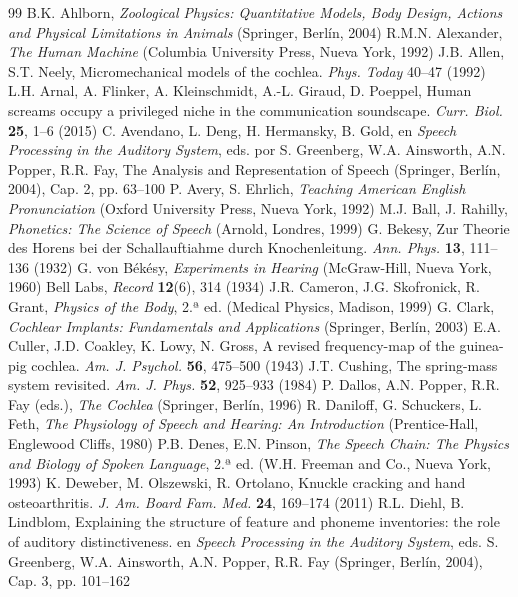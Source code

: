 \documentclass[12pt]{book}
\begin{document}
\begin{thebibliography}{99}
 B.K. Ahlborn, \textit{Zoological Physics: Quantitative Models, Body Design, Actions and Physical Limitations in Animals} (Springer, Berlín, 2004)
 R.M.N. Alexander, \textit{The Human Machine} (Columbia University Press, Nueva York, 1992)
 J.B. Allen, S.T. Neely, Micromechanical models of the cochlea. \textit{Phys. Today} 40--47 (1992)
 L.H. Arnal, A. Flinker, A. Kleinschmidt, A.-L. Giraud, D. Poeppel, Human screams occupy a privileged niche in the communication soundscape. \textit{Curr. Biol.} \textbf{25}, 1--6 (2015)
 C. Avendano, L. Deng, H. Hermansky, B. Gold, en \textit{Speech Processing in the Auditory System}, eds. por S. Greenberg, W.A. Ainsworth, A.N. Popper, R.R. Fay, The Analysis and Representation of Speech (Springer, Berlín, 2004), Cap. 2, pp. 63--100
 P. Avery, S. Ehrlich, \textit{Teaching American English Pronunciation} (Oxford University Press, Nueva York, 1992)
 M.J. Ball, J. Rahilly, \textit{Phonetics: The Science of Speech} (Arnold, Londres, 1999)
 G. Bekesy, Zur Theorie des Horens bei der Schallauftiahme durch Knochenleitung. \textit{Ann. Phys.} \textbf{13}, 111--136 (1932)
 G. von Békésy, \textit{Experiments in Hearing} (McGraw-Hill, Nueva York, 1960)
 Bell Labs, \textit{Record} \textbf{12}(6), 314 (1934)
 J.R. Cameron, J.G. Skofronick, R. Grant, \textit{Physics of the Body}, 2.ª ed. (Medical Physics, Madison, 1999)
 G. Clark, \textit{Cochlear Implants: Fundamentals and Applications} (Springer, Berlín, 2003)
 E.A. Culler, J.D. Coakley, K. Lowy, N. Gross, A revised frequency-map of the guinea-pig cochlea. \textit{Am. J. Psychol.} \textbf{56}, 475--500 (1943)
 J.T. Cushing, The spring-mass system revisited. \textit{Am. J. Phys.} \textbf{52}, 925--933 (1984)
 P. Dallos, A.N. Popper, R.R. Fay (eds.), \textit{The Cochlea} (Springer, Berlín, 1996)
 R. Daniloff, G. Schuckers, L. Feth, \textit{The Physiology of Speech and Hearing: An Introduction} (Prentice-Hall, Englewood Cliffs, 1980)
 P.B. Denes, E.N. Pinson, \textit{The Speech Chain: The Physics and Biology of Spoken Language}, 2.ª ed. (W.H. Freeman and Co., Nueva York, 1993)
 K. Deweber, M. Olszewski, R. Ortolano, Knuckle cracking and hand osteoarthritis. \textit{J. Am. Board Fam. Med.} \textbf{24}, 169--174 (2011)
 R.L. Diehl, B. Lindblom, Explaining the structure of feature and phoneme inventories: the role of auditory distinctiveness. en \textit{Speech Processing in the Auditory System}, eds. S. Greenberg, W.A. Ainsworth, A.N. Popper, R.R. Fay (Springer, Berlín, 2004), Cap. 3, pp. 101--162

\end{thebibliography}
\end{document}
